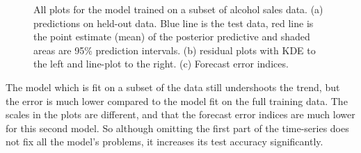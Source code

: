 \documentclass{article}
\begin{document}
\begin{figure}[H]
    \centering
    \quad
    \quad
    \caption{All plots for the model trained on a subset of alcohol sales data. (a) predictions on held-out data. Blue line is the test data, red line is the point estimate (mean) of the posterior predictive and shaded areas are 95\% prediction intervals. (b) residual plots with KDE to the left and line-plot to the right. (c) Forecast error indices.}
\end{figure}

\noindent The model which is fit on a subset of the data still undershoots the trend, but the error is much lower compared to the model fit on the full training data. The scales in the plots are different, and that the forecast error indices are much lower for this second model. So although omitting the first part of the time-series does not fix all the model's problems, it increases its test accuracy significantly. 
\end{document}
